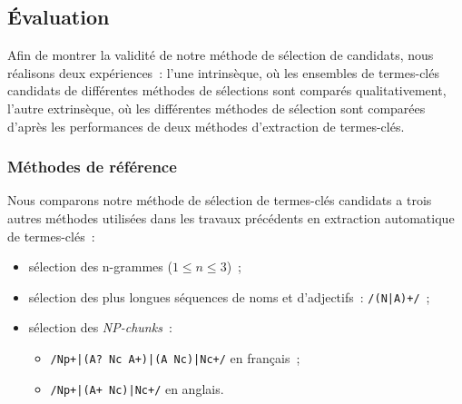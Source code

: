     \subsection{Évaluation}
    \label{subsec:main:domain_independent_keyphrase_extraction-keyphrase_candidate_selection-evaluation}
      Afin de montrer la validité de notre méthode de sélection de candidats,
      nous réalisons deux expériences~: l'une intrinsèque, où les ensembles de
      termes-clés candidats de différentes méthodes de sélections sont comparés
      qualitativement, l'autre extrinsèque, où les différentes méthodes de
      sélection sont comparées d'après les performances de deux méthodes
      d'extraction de termes-clés.

      \subsubsection{Méthodes de référence}
      \label{subsubsec:main:domain_independent_keyphrase_extraction-keyphrase_candidate_selection-evaluation-baselines}
        Nous comparons notre méthode de sélection de termes-clés candidats a
        trois autres méthodes utilisées dans les travaux précédents en
        extraction automatique de termes-clés~:
        \begin{itemize}
          \item{sélection des n-grammes ($1 \leq n \leq 3$)~;}
          \item{sélection des plus longues séquences de noms et d'adjectifs~:
                \texttt{/(N|A)+/}~;}
          \item{sélection des \textit{NP-chunks}~:}
          \begin{itemize}
            \item{\texttt{/Np+|(A? Nc A+)|(A Nc)|Nc+/} en français~;}
            \item{\texttt{/Np+|(A+ Nc)|Nc+/} en anglais.}
          \end{itemize}
        \end{itemize}

